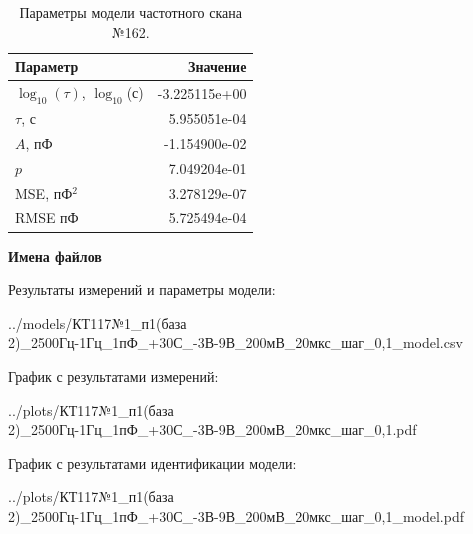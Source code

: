 \begin{table}[!ht]
    \centering
    \caption{Параметры модели частотного скана №162.}
    \begin{tabular}{|l|r|}
        \hline
        Параметр                                       & Значение                  \\ \hline
        $\log_{10}(\tau)$, $\log_{10}$(с)              & -3.225115e+00             \\ \hline
        $\tau$, с                                      & 5.955051e-04              \\ \hline
        $A$, пФ                                        & -1.154900e-02             \\ \hline
        $p$                                            & 7.049204e-01              \\ \hline
        MSE, пФ$^2$                                    & 3.278129e-07              \\ \hline
        RMSE пФ                                        & 5.725494e-04              \\ \hline
    \end{tabular}
    \label{table:frequency_scan_model_162}
\end{table}

\textbf{Имена файлов}

Результаты измерений и параметры модели:

\scriptsize../models/КТ117№1\_п1(база 2)\_2500Гц-1Гц\_1пФ\_+30С\_-3В-9В\_200мВ\_20мкс\_шаг\_0,1\_model.csv
\normalsize

График с результатами измерений:

\scriptsize../plots/КТ117№1\_п1(база 2)\_2500Гц-1Гц\_1пФ\_+30С\_-3В-9В\_200мВ\_20мкс\_шаг\_0,1.pdf
\normalsize

График с результатами идентификации модели:

\scriptsize../plots/КТ117№1\_п1(база 2)\_2500Гц-1Гц\_1пФ\_+30С\_-3В-9В\_200мВ\_20мкс\_шаг\_0,1\_model.pdf
\normalsize

